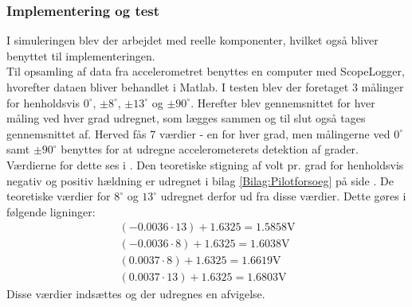\subsubsection{Implementering og test}
I simuleringen blev der arbejdet med reelle komponenter, hvilket også bliver benyttet til implementeringen. \\
Til opsamling af data fra accelerometret benyttes en computer med ScopeLogger, hvorefter dataen bliver behandlet i Matlab. I testen blev der foretaget 3 målinger for henholdsvis $0^\circ$, $\pm8^\circ$, $\pm13^\circ$ og $\pm90^\circ$. Herefter blev gennemsnittet for hver måling ved hver grad udregnet, som lægges sammen og til slut også tages gennemsnittet af. Herved fås 7 værdier - en for hver grad, men målingerne ved $0^\circ$ samt $\pm90^\circ$ benyttes for at udregne accelerometerets detektion af grader. Værdierne for dette ses i . Den teoretiske stigning af volt pr. grad for henholdsvis negativ og positiv hældning er udregnet i bilag \ref{Bilag:Pilotforsoeg} på side \pageref{Bilag:Pilotforsoeg}. De teoretiske værdier for $8^\circ$ og $13^\circ$ udregnet derfor ud fra disse værdier. Dette gøres i følgende ligninger:
\begin{align}
(-0.0036 \cdot 13) + 1.6325 = 1.5858\text{V} \\
(-0.0036 \cdot 8) + 1.6325 = 1.6038\text{V}  \\
(0.0037 \cdot 8) + 1.6325 = 1.6619\text{V}  \\
(0.0037 \cdot 13) + 1.6325 = 1.6803\text{V}
\end{align}
Disse værdier indsættes og der udregnes en afvigelse.
